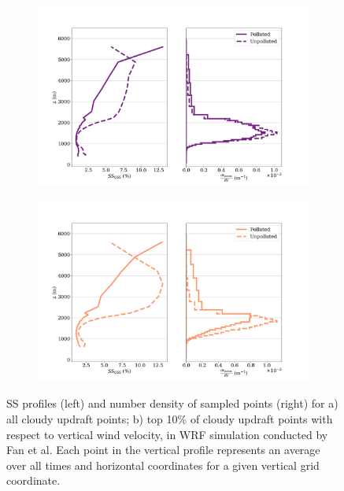\documentclass{article}
\begin{document}
\begin{figure}[ht]
	\centering
	\begin{subfigure}{0.7\textwidth}
		\includegraphics[width=\textwidth]{revmywrf/v4_FINAL_bipanel_ss_qss_vs_z_allpts_figure.png}
		\caption{}
		\label{wrfbipanelallpts}
	\end{subfigure}
	\begin{subfigure}{0.7\textwidth}
		\includegraphics[width=\textwidth]{revmywrf/v4_FINAL_bipanel_ss_qss_vs_z_up10perc_figure.png}
		\caption{}
		\label{wrfbipanelup50perc}
	\end{subfigure}
	\caption{SS profiles (left) and number density of sampled points (right) for a) all cloudy updraft points; b) top 10\% of cloudy updraft points with respect to vertical wind velocity, in WRF simulation conducted by Fan et al. Each point in the vertical profile represents an average over all times and horizontal coordinates for a given vertical grid coordinate.}
	\label{wrfbipanel}
\end{figure}
\end{document}

